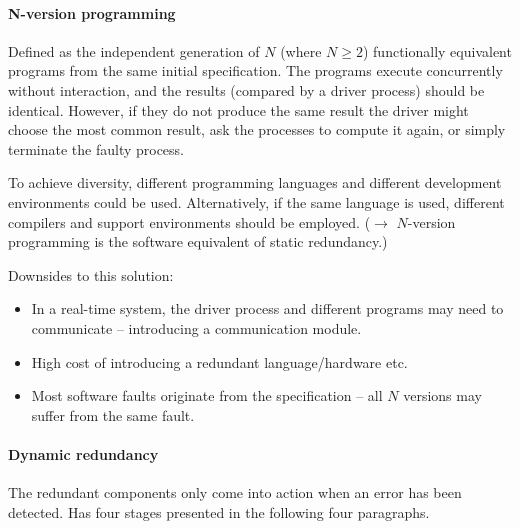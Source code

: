 \paragraph{N-version programming} Defined as the independent generation of $N$ (where $N \geq 2$) functionally equivalent programs from the same initial specification. The programs execute concurrently without interaction, and the results (compared by a driver process) should be identical. However, if they do not produce the same result the driver might choose the most common result, ask the processes to compute it again, or simply terminate the faulty process.

To achieve diversity, different programming languages and different development environments could be used. Alternatively, if the same language is used, different compilers and support environments should be employed. ($\rightarrow$ $N$-version programming is the software equivalent of static redundancy.)

Downsides to this solution:
\begin{itemize}[nolistsep,noitemsep]
  \item In a real-time system, the driver process and different programs may need to communicate -- introducing a communication module.
  \item High cost of introducing a redundant language/hardware etc.
  \item Most software faults originate from the specification -- all $N$ versions may suffer from the same fault.
\end{itemize}

\paragraph{Dynamic redundancy} The redundant components only come into action when an error has been detected. Has four stages presented in the following four paragraphs.

